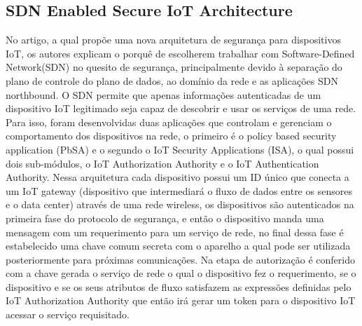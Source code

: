 \documentclass[article,12pt]{abntex2}
\begin{document}
\subsection{SDN Enabled Secure IoT Architecture}%
No artigo, a qual propõe uma nova arquitetura de segurança para dispositivos IoT, os autores explicam o porquê de escolherem trabalhar com Software-Defined Network(SDN) no quesito de segurança, principalmente devido à separação do plano de controle do plano de dados, ao domínio da rede e as aplicações SDN northbound. O SDN permite que apenas informações autenticadas de um dispositivo IoT legitimado seja capaz de descobrir e usar os serviços de uma rede. Para isso, foram desenvolvidas duas aplicações que controlam e gerenciam o comportamento dos dispositivos na rede, o primeiro é o policy based security application (PbSA) e o segundo o IoT Security Applications (ISA), o qual possui dois sub-módulos, o IoT Authorization Authority e o IoT Authentication Authority. Nessa arquitetura cada dispositivo possui um ID único que conecta a um IoT gateway (dispositivo que intermediará o fluxo de dados entre os sensores e o data center) através de uma rede wireless, os dispositivos são autenticados na primeira fase do protocolo de segurança, e então o dispositivo manda uma mensagem com um requerimento para um serviço de rede, no final dessa fase é estabelecido uma chave comum secreta com o aparelho a qual pode ser utilizada posteriormente para próximas comunicações. Na etapa de autorização é conferido com a chave gerada  o serviço de rede o qual o dispositivo fez o requerimento, se o dispositivo e se os seus atributos de fluxo satisfazem as expressões definidas pelo IoT Authorization Authority que então irá gerar um token para o dispositivo IoT acessar o serviço requisitado.
\end{document}

